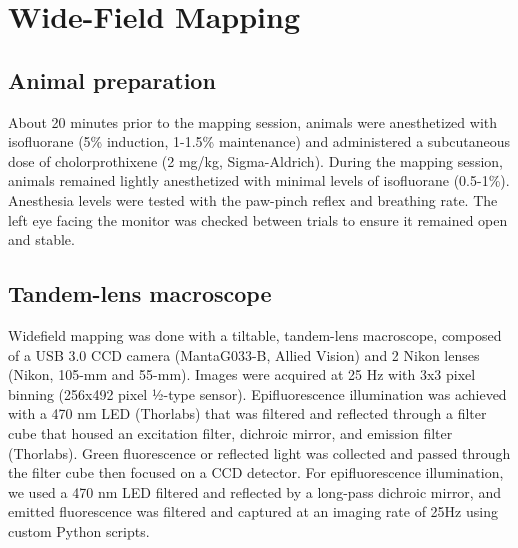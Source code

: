 \section{Wide-Field Mapping}
\subsection{Animal preparation}
About 20 minutes prior to the mapping session, animals were anesthetized with isofluorane (5\% induction, 1-1.5\% maintenance) and administered a subcutaneous dose of cholorprothixene (2 mg/kg, Sigma-Aldrich). During the mapping session, animals remained lightly anesthetized with minimal levels of isofluorane (0.5-1\%). Anesthesia levels were tested with the paw-pinch reflex and breathing rate. The left eye facing the monitor was checked between trials to ensure it remained open and stable. 

\subsection{Tandem-lens macroscope}
Widefield mapping was done with a tiltable, tandem-lens macroscope\cite{Ratzlaff1991, Kalatsky2003}, composed of a USB 3.0 CCD camera (MantaG033-B, Allied Vision) and 2 Nikon lenses (Nikon, 105-mm and 55-mm). Images were acquired at 25 Hz with 3x3 pixel binning (256x492 pixel ½-type sensor). Epifluorescence illumination was achieved with a 470 nm LED (Thorlabs) that was filtered and reflected through a filter cube that housed an excitation filter, dichroic mirror, and emission filter (Thorlabs). Green fluorescence or reflected light was collected and passed through the filter cube then focused on a CCD detector. For epifluorescence illumination, we used a 470 nm LED filtered and reflected by a long-pass dichroic mirror, and emitted fluorescence was filtered and captured at an imaging rate of 25Hz using custom Python scripts.


